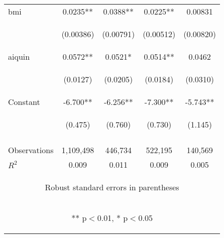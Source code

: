 \documentclass[]{article}
\begin{document}
\begin{center}
\begin{tabular}{lcccc}
bmi & 0.0235** & 0.0388** & 0.0225** & 0.00831 \\
\vspace{4pt} & \begin{footnotesize}(0.00386)\end{footnotesize} & \begin{footnotesize}(0.00791)\end{footnotesize} & \begin{footnotesize}(0.00512)\end{footnotesize} & \begin{footnotesize}(0.00820)\end{footnotesize} \\
aiquin & 0.0572** & 0.0521* & 0.0514** & 0.0462 \\
\vspace{4pt} & \begin{footnotesize}(0.0127)\end{footnotesize} & \begin{footnotesize}(0.0205)\end{footnotesize} & \begin{footnotesize}(0.0184)\end{footnotesize} & \begin{footnotesize}(0.0310)\end{footnotesize} \\
Constant & -6.700** & -6.256** & -7.300** & -5.743** \\
 & \begin{footnotesize}(0.475)\end{footnotesize} & \begin{footnotesize}(0.760)\end{footnotesize} & \begin{footnotesize}(0.730)\end{footnotesize} & \begin{footnotesize}(1.145)\end{footnotesize} \\
\vspace{4pt} & \begin{footnotesize}\end{footnotesize} & \begin{footnotesize}\end{footnotesize} & \begin{footnotesize}\end{footnotesize} & \begin{footnotesize}\end{footnotesize} \\
Observations & 1,109,498 & 446,734 & 522,195 & 140,569 \\
 $R^2$ & 0.009 & 0.011 & 0.009 & 0.005 \\ \hline
\multicolumn{5}{c}{\begin{footnotesize} Robust standard errors in parentheses\end{footnotesize}} \\
\multicolumn{5}{c}{\begin{footnotesize} ** p$<$0.01, * p$<$0.05\end{footnotesize}} \\
\end{tabular}
\end{center}
\end{document}
